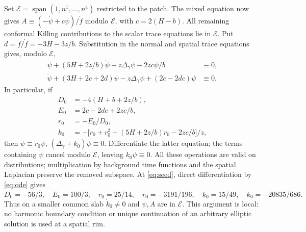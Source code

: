\documentclass[11pt]{article}
\begin{document}
Set \(\mathcal E=\operatorname{span}(1,n^1,\dots,n^4)\) restricted to the patch. The mixed equation now gives \(A\equiv(-\dot\psi+c\psi)/\dot f\) modulo \(\mathcal E\), with \(c=2(H-b)\). All remaining conformal Killing contributions to the scalar trace equations lie in \(\mathcal E\). Put \(d=\ddot f/\dot f=-3H-3z/b\). Substitution in the normal and spatial trace equations gives, modulo \(\mathcal E\),
\begin{align*}
 \ddot\psi+(5H+2z/b)\dot\psi-z\Delta_\gamma\psi-2zc\psi/b&\equiv0,\\
 \ddot\psi+(3H+2c+2d)\dot\psi-z\Delta_\gamma\psi
                       +(2\dot c-2dc)\psi&\equiv0.
\end{align*}
In particular, if
\begin{align*}
 D_0&=-4(H+b+2z/b),\\
 E_0&=2\dot c-2dc+2zc/b,\\
 r_0&=-E_0/D_0,\\
 k_0&=-\bigl[\dot r_0+r_0^2+(5H+2z/b)r_0-2zc/b\bigr]/z ,
\end{align*}
then \(\dot\psi\equiv r_0\psi\), \((\Delta_\gamma+k_0)\psi\equiv0\). Differentiate the latter equation; the terms containing \(\dot\psi\) cancel modulo \(\mathcal E\), leaving \(\dot k_0\psi\equiv0\). All these operations are valid on distributions; multiplication by background time functions and the spatial Laplacian preserve the removed subspace. At \eqref{eq:seed}, direct differentiation by \eqref{eq:ode} gives
\[
 D_0=-56/3,\quad E_0=100/3,\quad
 r_0=25/14,\quad \dot r_0=-3191/196,\quad
 k_0=15/49,\quad \dot k_0=-20835/686 .
\]
Thus on a smaller common slab \(\dot k_0\ne0\) and \(\psi,A\) are in \(\mathcal E\). This argument is local: no harmonic boundary condition or unique continuation of an arbitrary elliptic solution is used at a spatial rim.
\end{document}
